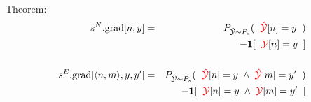{

Theorem:
\begin{eqnarray*}
    s^N.\mathrm{grad}[n,y] & = &   P_{\hat{\cal Y} \sim P_s}(\;\;{\color{red} \hat{\cal Y}}[n] = y\;\;) \\
    & & \;\;\;\;\;- \mathbf{1}[\;\;{\color{red} {\cal Y}}[n] = y\;\;] \\
    \\
    s^E.\mathrm{grad}[{\mbox{$\langle n,m\rangle$}},y,y'] & = &  P_{\hat{\cal Y} \sim P_s}(\;\;{\color{red} \hat{\cal Y}}[n] = y \; \wedge \; {\color{red} \hat{\cal Y}}[m] = y'\;\;) \\
    & & \;\;\;\;\;- \mathbf{1}[\;\;{\color{red} {\cal Y}}[n] = y\; \wedge \; {\color{red} {\cal Y}}[m] = y'\;\;]
\end{eqnarray*}


}



